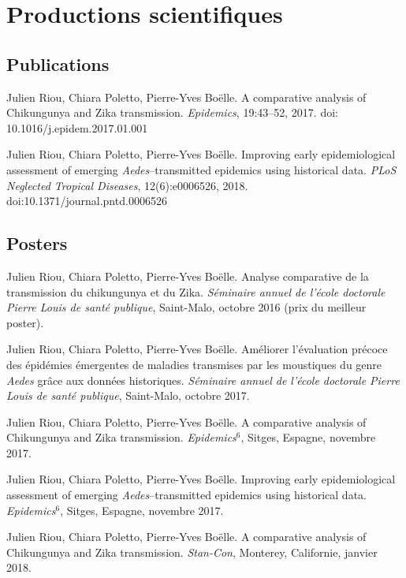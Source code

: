 \clearpage\singlespacing
\section*{Productions scientifiques}
\vspace{2em}

\subsection*{Publications}

\noindent Julien Riou, Chiara Poletto, Pierre-Yves Boëlle. A comparative analysis of Chikungunya and Zika transmission. {\em Epidemics}, 19:43--52, 2017. doi: 10.1016/j.epidem.2017.01.001 

\vspace{1.5em}

\noindent Julien Riou, Chiara Poletto, Pierre-Yves Boëlle. Improving early epidemiological assessment of emerging {\em Aedes}--transmitted epidemics using historical data. {\em PLoS Neglected Tropical Diseases}, 12(6):e0006526, 2018. doi:10.1371/journal.pntd.0006526


\subsection*{Posters}

\noindent Julien Riou, Chiara Poletto, Pierre-Yves Boëlle. Analyse comparative de la transmission du chikungunya et du Zika. \textit{Séminaire annuel de l'école doctorale Pierre Louis de santé publique}, Saint-Malo, octobre 2016 (prix du meilleur poster).

\vspace{1.5em}
\noindent Julien Riou, Chiara Poletto, Pierre-Yves Boëlle. Améliorer l'évaluation précoce des épidémies émergentes de maladies transmises par les moustiques du genre {\em Aedes} grâce aux données historiques. \textit{Séminaire annuel de l'école doctorale Pierre Louis de santé publique}, Saint-Malo, octobre 2017.

\vspace{1.5em}
\noindent Julien Riou, Chiara Poletto, Pierre-Yves Boëlle. A comparative analysis of Chikungunya and Zika transmission. \textit{Epidemics$^6$}, Sitges, Espagne, novembre 2017.

\vspace{1.5em}
\noindent Julien Riou, Chiara Poletto, Pierre-Yves Boëlle. Improving early epidemiological assessment of emerging {\em Aedes}--transmitted epidemics using historical data. \textit{Epidemics$^6$}, Sitges, Espagne, novembre 2017.

\vspace{1.5em}
\noindent Julien Riou, Chiara Poletto, Pierre-Yves Boëlle. A comparative analysis of Chikungunya and Zika transmission. \textit{Stan-Con}, Monterey, Californie, janvier 2018.
